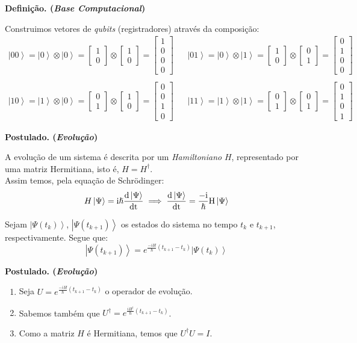 \documentclass[t]{beamer}
\newcommand{\ii}{
	\rm{i}
}
\newcommand{\postulado}[1]{%
	\textbf{Postulado. (\emph{#1})\\}
}
\newcommand{\definicao}[1]{%
	\textbf{Definição. (\emph{#1})\\}
}
\newcommand{\vetor}[2]{\ensuremath{
\left[\begin{matrix}
#1 \\
#2
\end{matrix}\right]
}
}
\newcommand{\vetorx}[4]{\ensuremath{
\left[\begin{matrix}
#1 \\
#2 \\
#3 \\
#4
\end{matrix}\right]
}
}
\newcommand{\ket}[1]{\ensuremath{\left|#1\right\rangle}}
\begin{document}
	
	
	\begin{frame}{\subsecname}
		\definicao{Base Computacional}
		Construimos vetores de \textit{qubits} (registradores) através da composição:
		\footnotesize
		\begin{align*}
		\ket{00} = \ket{0} \otimes \ket{0} = \vetor{1}{0} \otimes \vetor{1}{0} = \vetorx{1}{0}{0}{0} &&
		\ket{01} = \ket{0} \otimes \ket{1} = \vetor{1}{0} \otimes \vetor{0}{1} = \vetorx{0}{1}{0}{0} \\
		~\\
		\ket{10} = \ket{1} \otimes \ket{0} = \vetor{0}{1} \otimes \vetor{1}{0} = \vetorx{0}{0}{1}{0} &&
		\ket{11} = \ket{1} \otimes \ket{1} = \vetor{0}{1} \otimes \vetor{0}{1} = \vetorx{0}{1}{0}{1}
		\end{align*}
		\normalsize
	\end{frame}
	
	\begin{frame}{\subsecname}
		\postulado{Evolução}
		A evolução de um sistema é descrita por um \textit{Hamiltoniano} $H$, representado por uma matriz Hermitiana, isto é, $H = H^{\dagger}$.\\
		
		Assim temos, pela equação de Schrödinger:
		$$H \ket{\Psi} =\ii \hslash \frac{d \ket{\Psi}}{dt} \implies \frac{d \ket{\Psi}}{dt} = \frac{-\ii}{\hslash} H \ket{\Psi}$$
		
		Sejam $\ket{\Psi(t_k)}$, $\ket{\Psi(t_{k+1})}$ os estados do sistema no tempo $t_k$ e $t_{k+1}$, respectivamente. Segue que:
		$$\ket{\Psi(t_{k+1})} = e^{\frac{-i H}{\hslash} (t_{k+1} - t_k)} \ket{\Psi(t_k)}$$
	\end{frame}
	
	\begin{frame}{\subsecname}
		\postulado{Evolução}
		\begin{enumerate}
			\item<1-> Seja $U = e^{\frac{-i H}{\hslash} (t_{k+1} - t_k)}$ o operador de evolução.
			\item<2-> Sabemos também que $U^{\dagger} = e^{\frac{i H^{\dagger}}{\hslash} (t_{k+1} - t_k)}$.
			\item<3-> Como a matriz $H$ é Hermitiana, temos que $U^{\dagger} U = I$.
		\end{enumerate}
		
	 \bigskip

	\vspace{1 cm}
	
	
	\end{frame}
	
\end{document}
